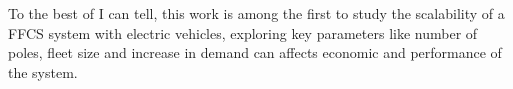 To the best of I can tell, this work is among the first to study the scalability of a FFCS system with electric vehicles, exploring key parameters like number of poles, fleet size and increase in demand can affects economic and performance of the system.


